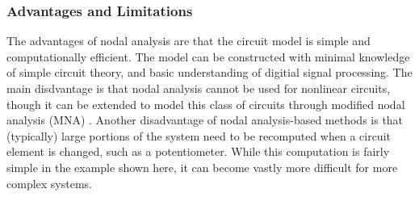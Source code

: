 \documentclass[twoside,a4paper]{article}
\begin{document}
\subsubsection{Advantages and Limitations}
The advantages of nodal analysis are that the circuit model
is simple and computationally efficient. The model can be constructed
with minimal knowledge of simple circuit theory, and basic understanding
of digitial signal processing. The main disdvantage is that nodal analysis
cannot be used for nonlinear circuits, though it can be extended
to model this class of circuits through modified nodal analysis (MNA)
\cite{MNA}. Another disadvantage of nodal analysis-based methods
is that (typically) large portions of the system need to be recomputed
when a circuit element is changed, such as a potentiometer. While this
computation is fairly simple in the example shown here, it can become
vastly more difficult for more complex systems.
\end{document}
